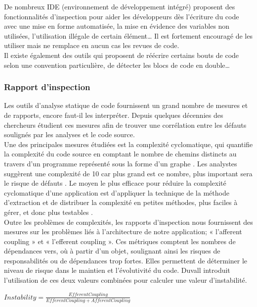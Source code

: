     De nombreux IDE (environnement de développement intégré) proposent des fonctionnalités d’inspection pour aider les développeurs dès l’écriture du code avec une mise en forme automatisée, la mise en évidence des variables non utilisées, l’utilisation illégale de certain élément… Il est fortement encouragé de les utiliser mais ne remplace en aucun cas les revues de code.\\

    Il existe également des outils qui proposent de réécrire certains bouts de code selon une convention particulière, de détecter les blocs de code en double…

      \subsubsection{Rapport d’inspection}
      Les outils d’analyse statique de code fournissent un grand nombre de mesures et de rapports, encore faut-il les interpréter. Depuis quelques décennies des chercheurs étudient ces mesures afin de trouver une corrélation entre les défauts soulignés par les analyses et le code source.\\

      Une des principales mesures étudiées est la complexité cyclomatique, qui quantifie la complexité du code source en comptant le nombre de chemins distincts au travers d'un programme représenté sous la forme d'un graphe \cite{Kan03}. Les analystes suggèrent une complexité de 10 car plus grand est ce nombre, plus important sera le risque de défauts \cite{Wat96}. Le moyen le plus efficace pour réduire la complexité cyclomatique d’une application est d'appliquer la technique de la méthode d'extraction et de distribuer la complexité en petites méthodes, plus faciles à gérer, et donc plus testables \cite{Duv07}.\\

      Outre les problèmes de complexités, les rapports d’inspection nous fournissent des mesures sur les problèmes liés à l’architecture de notre application; « l’afferent coupling » et « l’efferent coupling ». Ces métriques comptent les nombres de dépendances vers, où à partir d’un objet, soulignant ainsi les risques de responsabilités ou de dépendances trop fortes. Elles permettent de déterminer le niveau de risque dans le maintien et l’évolutivité du code. Duvall introduit l'utilisation de ces deux valeurs combinées pour calculer une valeur d'instabilité.\\

      \begin{center}
          $Instability=\frac{EfferentCoupling}{EfferentCoupling + AfferentCoupling}$\\
      \end{center}

